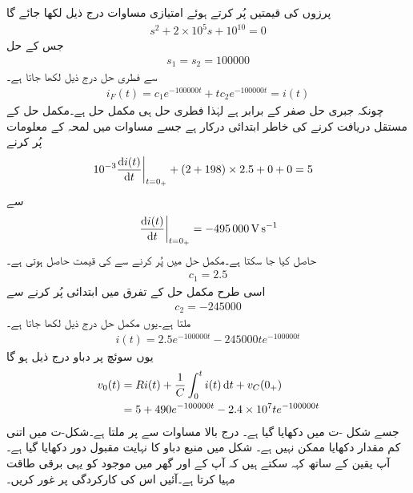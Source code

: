 پرزوں کی قیمتیں پُر کرتے ہوئے امتیازی مساوات درج ذیل لکھا جائے گا
\begin{align*}
s^2+2\times 10^5 s+10^{10}=0
\end{align*}
جس کے حل
\begin{align*}
s_1=s_2=\num{100000}
\end{align*}
سے فطری حل درج ذیل لکھا جاتا ہے۔
\begin{align*}
i_F(t)=c_1e^{-100000t}+t c_2e^{-100000t}=i(t)
\end{align*}
چونکہ جبری حل صفر کے برابر ہے لہٰذا فطری حل ہی مکمل حل  ہے۔مکمل حل کے مستقل دریافت کرنے کی خاطر ابتدائی  درکار  ہے جسے مساوات   میں لمحہ  کے معلومات پُر کرنے
\begin{align*}
\left. 10^{-3}\frac{\dif i(t)}{\dif t}\right|_{t=0_+}+(2+198)\times 2.5+0+0&=5
\end{align*}
سے
\begin{align*}
\left. \frac{\dif i(t)}{\dif t}\right|_{t=0_+}=\SI{-495000}{\volt\per\second}
\end{align*}
حاصل کیا جا سکتا ہے۔مکمل حل میں  پُر کرنے سے   کی قیمت حاصل ہوتی ہے۔
\begin{align*}
c_1=2.5
\end{align*}
اسی طرح مکمل حل کے تفرق میں ابتدائی  پُر کرنے سے
\begin{align*}
c_2=\num{-245000}
\end{align*}
ملتا ہے۔یوں مکمل حل درج ذیل لکھا جاتا ہے۔
\begin{align*}
i(t)=2.5e^{-100000t}-245000 t e^{-100000t}
\end{align*}
یوں سوئچ پر دباو درج ذیل ہو گا
\begin{align*}
v_0(t)&=Ri(t)+\frac{1}{C}\int_{0}^{t} i(t) \dif t+v_C(0_+)\\
&=5+490e^{-100000t}-2.4\times 10^7 t e^{-100000 t}
\end{align*}
جسے شکل -ت میں دکھایا گیا ہے۔ درج بالا مساوات سے  پر  ملتا ہے۔شکل-ت میں اتنی کم مقدار دکھایا ممکن نہیں ہے۔
شکل  میں منبع دباو کا نہایت مقبول دور دکھایا گیا ہے۔آپ یقین کے ساتھ کہہ سکتے ہیں کہ آپ کے  اور گھر میں موجود  کو یہی برقی طاقت مہیا کرتا ہے۔آئیں اس کی کارکردگی پر غور کریں۔
